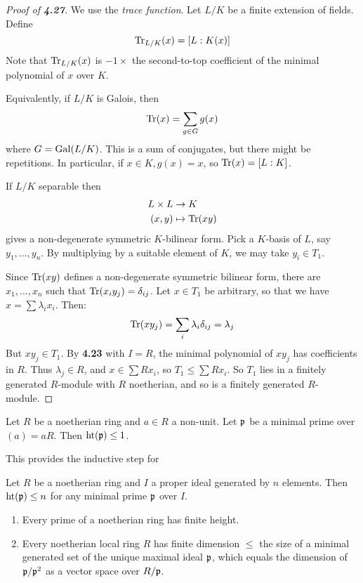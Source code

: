 \documentclass[10pt,a4paper]{article}
\begin{document}
\begin{proof}[Proof of \textbf{4.27}]
  We use the \emph{trace function}. Let $L/K$ be a finite extension of fields. Define
  \[\operatorname{Tr}_{L/K}(x) = [L:K(x)]\]
  Note that $\operatorname{Tr}_{L/K}(x)$ is $-1\times$ the second-to-top coefficient of the minimal polynomial of $x$ over $K$.

  Equivalently, if $L/K$ is Galois, then
  \[\operatorname{Tr}(x) = \sum_{g\in G}g(x)\]
  where $G = \operatorname{Gal}(L/K)$. This is a sum of conjugates, but there might be repetitions. In particular, if $x \in K, g(x) = x$, so $\operatorname{Tr}(x) = [L:K]$.

  If $L/K$ separable then
  \begin{align*}
    L \times L &\to K\\
    (x, y) & \mapsto \operatorname{Tr}(xy)
  \end{align*}
  gives a non-degenerate symmetric $K$-bilinear form. Pick a $K$-basis of $L$, say $y_1, \ldots, y_n$. By multiplying by a suitable element of $K$, we may take $y_i \in T_1$.

  Since $\operatorname{Tr}(xy) $ defines a non-degenerate symmetric bilinear form, there are $x_1, \ldots, x_n$ such that $\operatorname{Tr}(x_iy_j) = \delta_{ij}$. Let $x \in T_1$ be arbitrary, so that we have $x = \sum \lambda_i x_i$. Then:
  \[\operatorname{Tr}(xy_j) = \sum_i \lambda_i \delta_{ij} = \lambda_j\]
  But $xy_j \in T_1$. By \textbf{4.23} with $I = R$, the minimal polynomial of $xy_j$ has coefficients in $R$. Thus $\lambda_j \in R$, and $x \in \sum Rx_i$, so $T_1 \leq \sum Rx_i$. So $T_1$ lies in a finitely generated $R$-module with $R$ noetherian, and so is a finitely generated $R$-module.
\end{proof}
\begin{theorem}
  Let $R$ be a noetherian ring and $a \in R$ a non-unit. Let $\mathfrak{p}$ be a minimal prime over $(a) = aR$. Then $\operatorname{ht}(\mathfrak{p}) \leq 1$.
\end{theorem}
This provides the inductive step for
\begin{theorem}
  Let $R$ be a noetherian ring and $I$ a proper ideal generated by $n$ elements. Then $\operatorname{ht}(\mathfrak{p}) \leq n$ for any minimal prime $\mathfrak{p}$ over $I$.
\end{theorem}
\begin{corollary}\hspace*{0cm}
  \begin{enumerate}
    \item Every prime of a noetherian ring has finite height.
    \item Every noetherian local ring $R$ has finite dimension $\leq$ the size of a minimal generated set of the unique maximal ideal $\mathfrak{p}$, which equals the dimension of $\mathfrak{p}/\mathfrak{p}^2$ as a vector space over $R/\mathfrak{p}$.
  \end{enumerate}
\end{corollary}
\end{document}
